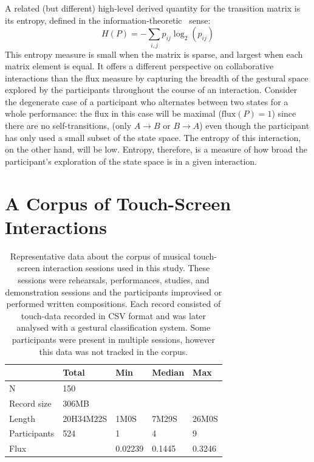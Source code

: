 \documentclass{sigchi}
\begin{document}
A related (but different) high-level derived quantity for the
transition matrix is its entropy, defined in the
information-theoretic~\cite{Shannon:1948rt} sense:
\begin{equation}
  H(P) = -\sum_{i,j}p_{ij}\log_2(p_{ij})
\end{equation}
This entropy measure is small when the matrix is sparse, and largest
when each matrix element is equal. It offers a different perspective
on collaborative interactions than the flux measure by capturing the
breadth of the gestural space explored by the participants throughout
the course of an interaction. Consider the degenerate case of a
participant who alternates between two states for a whole performance:
the flux in this case will be maximal ($\mathrm{flux}(P) = 1$) since
there are no self-transitions, (only $A \rightarrow B$ or
$ B \rightarrow A$) even though the participant has only used a small
subset of the state space. The entropy of this interaction,
on the other hand, will be low. Entropy, therefore, is a measure of
how broad the participant's exploration of the state space is in a given
interaction.

\section{A Corpus of Touch-Screen Interactions}

\begin{table}
\begin{tabular}{l|llll}
\hline
            & Total & Min  & Median   & Max     \\ 
\hline
N           & 150       &         &        &  \\
Record size & 306MB     &         &        &   \\
Length      & 20H34M22S & 1M0S    & 7M29S  & 26M0S\\
Participants& 524       & 1       & 4      & 9    \\
Flux        &           & 0.02239 & 0.1445 & 0.3246\\
\hline
\end{tabular}
\caption{
  Representative data about the corpus of musical touch-screen
  interaction sessions used in this study. These sessions were
  rehearsals, performances, studies, and demonstration sessions and the
  participants improvised or performed written compositions. Each record
  consisted of touch-data recorded in CSV format and was later analysed
  with a gestural classification system. Some participants were
  present in multiple sessions, however this data was not tracked in
  the corpus.\label{corpus-table}}
\end{table}
\end{document}
